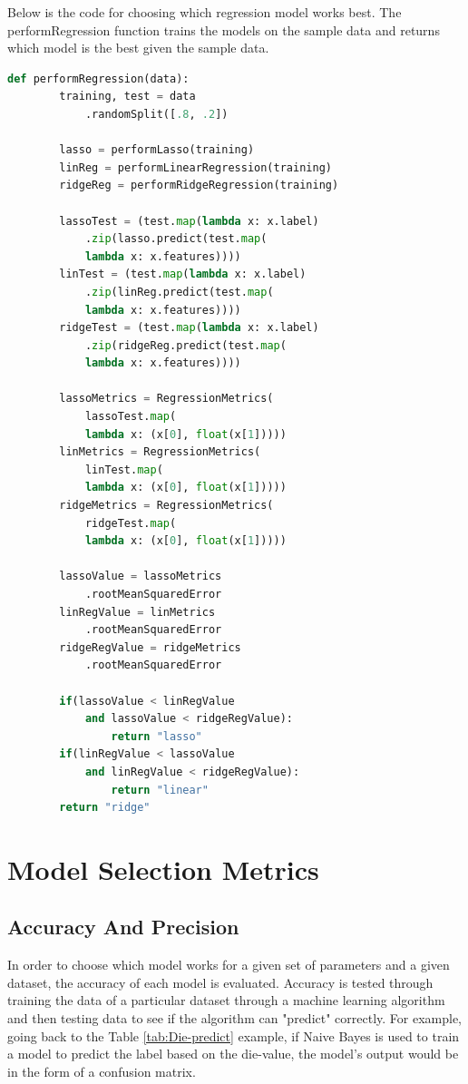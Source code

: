 \documentclass[9pt,twocolumn,twoside]{idsi}
\begin{document}
Below is the code for choosing which regression model works best. The performRegression function trains the models on the sample data and returns which model is the best given the sample data. 


\begin{lstlisting}[language=Python]
def performRegression(data):
        training, test = data
        	.randomSplit([.8, .2])
            
        lasso = performLasso(training)
        linReg = performLinearRegression(training)
        ridgeReg = performRidgeRegression(training)

        lassoTest = (test.map(lambda x: x.label)
        	.zip(lasso.predict(test.map(
            lambda x: x.features))))
        linTest = (test.map(lambda x: x.label)
        	.zip(linReg.predict(test.map(
            lambda x: x.features))))
        ridgeTest = (test.map(lambda x: x.label)
        	.zip(ridgeReg.predict(test.map(
            lambda x: x.features))))

        lassoMetrics = RegressionMetrics(
        	lassoTest.map(
            lambda x: (x[0], float(x[1]))))
        linMetrics = RegressionMetrics(
        	linTest.map(
            lambda x: (x[0], float(x[1]))))
        ridgeMetrics = RegressionMetrics(
        	ridgeTest.map(
            lambda x: (x[0], float(x[1]))))

        lassoValue = lassoMetrics
        	.rootMeanSquaredError
        linRegValue = linMetrics
        	.rootMeanSquaredError
        ridgeRegValue = ridgeMetrics
        	.rootMeanSquaredError

        if(lassoValue < linRegValue 
        	and lassoValue < ridgeRegValue):
                return "lasso"
        if(linRegValue < lassoValue 
        	and linRegValue < ridgeRegValue):
                return "linear"
        return "ridge"
\end{lstlisting}





\section{Model Selection Metrics} \label{modelMetrics}

\subsection{Accuracy And Precision}
In order to choose which model works for a given set of parameters and a given dataset, the accuracy of each model is evaluated. Accuracy is tested through training the data of a particular dataset through a machine learning algorithm and then testing data to see if the algorithm can "predict" correctly. For example, going back to the Table \ref{tab:Die-predict} example, if Naive Bayes is used to train a model to predict the label based on the die-value, the model's output would be in the form of a confusion matrix. 
\end{document}
